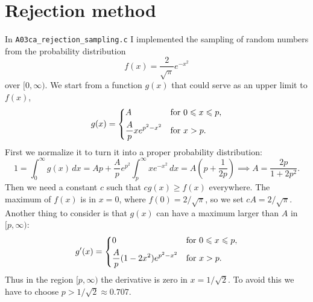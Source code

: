\section{Rejection method}
In \texttt{A03ca\_rejection\_sampling.c} I implemented the sampling of random
numbers from the probability distribution
\begin{equation}
    f(x) = \frac{2}{\sqrt{\pi}} e^{-x^{2}}
\end{equation}
over $[0, \infty)$. We start from a function $g(x)$ that could serve as an
upper limit to $f(x)$,
\begin{equation}
    g(x) =
    \begin{dcases}
        A & \text{for } 0 \leq x \leq p, \\
        \frac{A}{p}x e^{p^{2} - x^{2}} & \text{for } x > p.
    \end{dcases}
\end{equation}
First we normalize it to turn it into a proper probability distribution:
\begin{equation}
    1 = \int_{0}^{\infty} g(x) \, dx = Ap + \frac{A}{p}e^{p^{2}}
    \int_{p}^{\infty} x e^{-x^{2}} \, dx = A \left(p + \frac{1}{2p}\right)
    \implies A = \frac{2p}{1 + 2p^{2}}.
\end{equation}
Then we need a constant $c$ such that $c g(x) \geq f(x)$ everywhere. The maximum
of $f(x)$ is in $x = 0$, where $f(0) = 2 / \sqrt{\pi}$, so we set $c A = 2 /
\sqrt{\pi}$. Another thing to consider is that $g(x)$ can have a maximum larger
than $A$ in $[p, \infty)$:
\begin{equation}
    g'(x) = 
    \begin{dcases}
        0 & \text{for } 0 \leq x \leq p, \\
        \frac{A}{p}(1 - 2x^{2}) e^{p^{2} - x^{2}} & \text{for } x > p.
    \end{dcases}
\end{equation}
Thus in the region $[p, \infty)$ the derivative is zero in $x = 1 / \sqrt{2}$.
To avoid this we have to choose $p > 1 / \sqrt{2} \approx \num{0.707}$.

